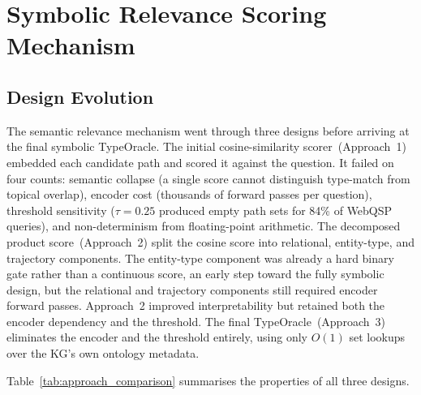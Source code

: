 \section{Symbolic Relevance Scoring Mechanism}
\label{sec:ch3scorer}

\subsection{Design Evolution}

The semantic relevance mechanism went through three designs before arriving at the final symbolic TypeOracle. The initial cosine-similarity scorer~(Approach~1) embedded each candidate path and scored it against the question. It failed on four counts: semantic collapse (a single score cannot distinguish type-match from topical overlap), encoder cost (thousands of forward passes per question), threshold sensitivity ($\tau = 0.25$ produced empty path sets for 84\% of WebQSP queries), and non-determinism from floating-point arithmetic. The decomposed product score~(Approach~2) split the cosine score into relational, entity-type, and trajectory components. The entity-type component was already a hard binary gate rather than a continuous score, an early step toward the fully symbolic design, but the relational and trajectory components still required encoder forward passes. Approach~2 improved interpretability but retained both the encoder dependency and the threshold. The final TypeOracle~(Approach~3) eliminates the encoder and the threshold entirely, using only $O(1)$ set lookups over the KG's own ontology metadata.

Table~\ref{tab:approach_comparison} summarises the properties of all three designs.

